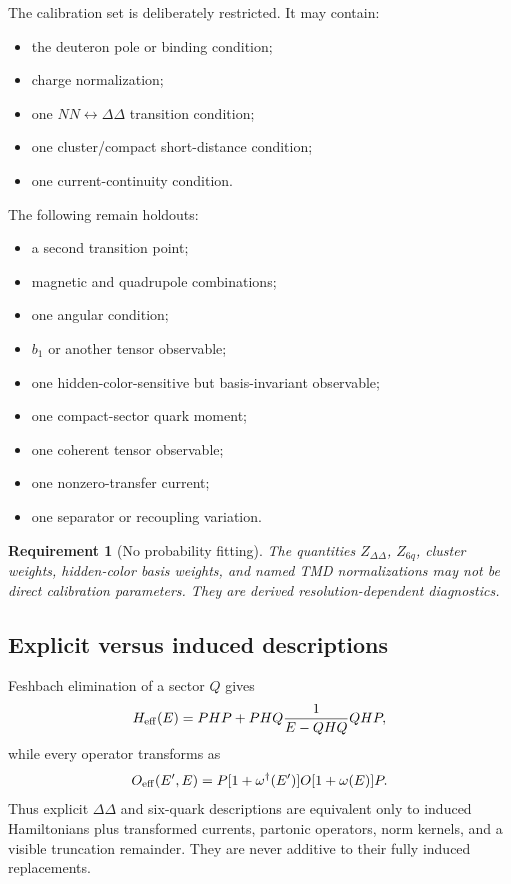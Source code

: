 \documentclass[11pt]{article}
\newtheorem{requirement}[definition]{Requirement}
\begin{document}
The calibration set is deliberately restricted.  It may contain:
\begin{itemize}
\item the deuteron pole or binding condition;
\item charge normalization;
\item one \(NN\leftrightarrow\Delta\Delta\) transition condition;
\item one cluster/compact short-distance condition;
\item one current-continuity condition.
\end{itemize}
The following remain holdouts:
\begin{itemize}
\item a second transition point;
\item magnetic and quadrupole combinations;
\item one angular condition;
\item \(b_1\) or another tensor observable;
\item one hidden-color-sensitive but basis-invariant observable;
\item one compact-sector quark moment;
\item one coherent tensor observable;
\item one nonzero-transfer current;
\item one separator or recoupling variation.
\end{itemize}

\begin{requirement}[No probability fitting]
The quantities \(Z_{\Delta\Delta}\), \(Z_{6q}\), cluster weights, hidden-color basis weights, and named TMD normalizations may not be direct calibration parameters.  They are derived resolution-dependent diagnostics.
\label{req:no-probability-fit}
\end{requirement}

\subsection{Explicit versus induced descriptions}

Feshbach elimination of a sector \(Q\) gives
\begin{equation}
 H_{\rm eff}(E)
 =PHP+PHQ\frac1{E-QHQ}QHP,
\label{eq:n3-feshbach-H}
\end{equation}
while every operator transforms as
\begin{equation}
 O_{\rm eff}(E',E)
 =P[1+\omega^\dagger(E')]O[1+\omega(E)]P.
\label{eq:n3-feshbach-O}
\end{equation}
Thus explicit \(\Delta\Delta\) and six-quark descriptions are equivalent only to induced Hamiltonians plus transformed currents, partonic operators, norm kernels, and a visible truncation remainder.  They are never additive to their fully induced replacements.
\end{document}
